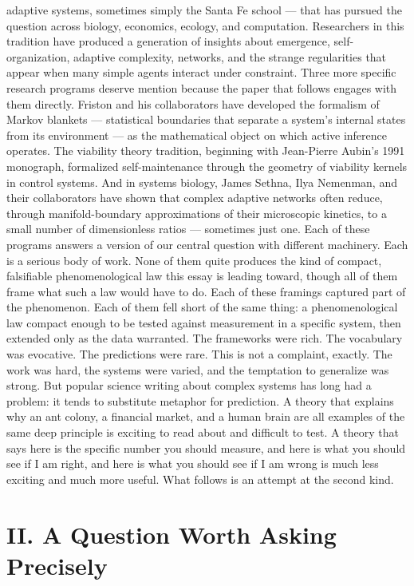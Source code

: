 \documentclass[12pt]{article}
\begin{document}
adaptive systems, sometimes simply the Santa Fe school --- that has pursued the question across biology, economics, ecology, and computation. Researchers in this tradition have produced a generation of insights about emergence, self-organization, adaptive complexity, networks, and the strange regularities that appear when many simple agents interact under constraint. Three more specific research programs deserve mention because the paper that follows engages with them directly. Friston and his collaborators have developed the formalism of Markov blankets --- statistical boundaries that separate a system's internal states from its environment --- as the mathematical object on which active inference operates. The viability theory tradition, beginning with Jean-Pierre Aubin's 1991 monograph, formalized self-maintenance through the geometry of viability kernels in control systems. And in systems biology, James Sethna, Ilya Nemenman, and their collaborators have shown that complex adaptive networks often reduce, through manifold-boundary approximations of their microscopic kinetics, to a small number of dimensionless ratios --- sometimes just one. Each of these programs answers a version of our central question with different machinery. Each is a serious body of work. None of them quite produces the kind of compact, falsifiable phenomenological law this essay is leading toward, though all of them frame what such a law would have to do. Each of these framings captured part of the phenomenon. Each of them fell short of the same thing: a phenomenological law compact enough to be tested against measurement in a specific system, then extended only as the data warranted. The frameworks were rich. The vocabulary was evocative. The predictions were rare. This is not a complaint, exactly. The work was hard, the systems were varied, and the temptation to generalize was strong. But popular science writing about complex systems has long had a problem: it tends to substitute metaphor for prediction. A theory that explains why an ant colony, a financial market, and a human brain are all examples of the same deep principle is exciting to read about and difficult to test. A theory that says here is the specific number you should measure, and here is what you should see if I am right, and here is what you should see if I am wrong is much less exciting and much more useful. What follows is an attempt at the second kind.


\section*{II. A Question Worth Asking Precisely}
\end{document}
